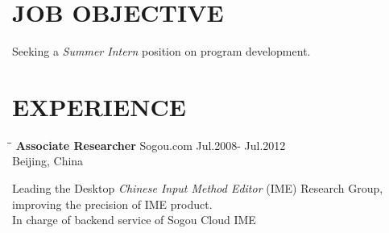 \documentclass{res}
\begin{document}
 


\address{\bf  ADDRESS\\Donald Bren Hall, Room 2062\\University of California,Irvine\\Irvine,CA 92967}
\address{\bf  CONTACT\\jianfeng.jia@gmail.com\\jianfeng.jia@uci.edu\\(949) 678-9893}
                                  
\begin{resume}

\section{JOB OBJECTIVE}          
    Seeking a \emph{Summer Intern} position on program development.

\section{EXPERIENCE}
   \vspace{-0.1in}	
   \begin{tabbing}
   \hspace{2.3in}\= \hspace{2.6in}\= \kill %
    {\bf Associate Researcher} \>Sogou.com     \>Jul.2008- Jul.2012\\
                             \>Beijing, China
   \end{tabbing}\vspace{-20pt}      %
   Leading the Desktop \emph{Chinese Input Method Editor} (IME) Research Group,
    improving the precision of IME product. \\
    In charge of backend service of Sogou Cloud IME


\end{resume}
\end{document}
